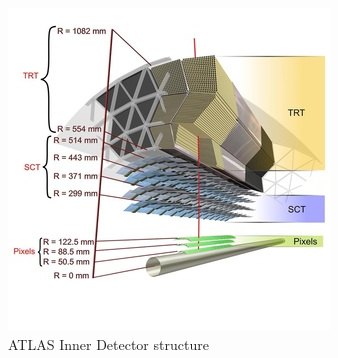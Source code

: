 \documentclass[a4paper, oneside]{book}
\begin{document}
			\begin{figure}
				\centering
				\includegraphics[width=0.3\textheight]{tesi_images/ID_structure.jpg}
				\caption{ATLAS Inner Detector structure}
			\end{figure}
			
\end{document}

